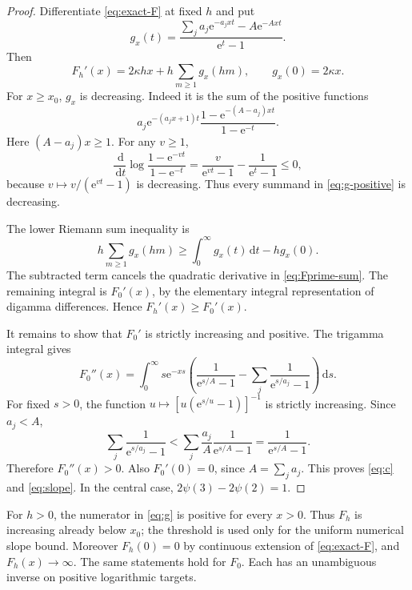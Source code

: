 \documentclass[11pt,a4paper]{article}
\numberwithin{equation}{section}
\theoremstyle{definition}\newtheorem{definition}[theorem]{Definition}
\theoremstyle{remark}\newtheorem{remark}[theorem]{Remark}
\newcommand{\e}{\mathrm e}
\newcommand{\dd}{\,\mathrm d}
\begin{document}
\begin{proof}
Differentiate \eqref{eq:exact-F} at fixed $h$ and put
\begin{equation}
 g_x(t)=\frac{\sum_j a_j\e^{-a_jxt}-A\e^{-Axt}}{\e^t-1}.
 \label{eq:g}
\end{equation}
Then
\begin{equation}
 F_h'(x)=2\kappa hx+h\sum_{m\ge1}g_x(hm),\qquad
 g_x(0)=2\kappa x.
 \label{eq:Fprime-sum}
\end{equation}
For $x\ge x_0$, $g_x$ is decreasing. Indeed it is the sum of the positive
functions
\begin{equation}
 a_j\e^{-(a_jx+1)t}
       \frac{1-\e^{-(A-a_j)xt}}{1-\e^{-t}}.
 \label{eq:g-positive}
\end{equation}
Here $(A-a_j)x\ge1$. For any $v\ge1$,
\[
 \frac{\dd}{\dd t}\log\frac{1-\e^{-vt}}{1-\e^{-t}}
      =\frac{v}{\e^{vt}-1}-\frac1{\e^t-1}\le0,
\]
because $v\mapsto v/(\e^{vt}-1)$ is decreasing. Thus every summand in
\eqref{eq:g-positive} is decreasing.

The lower Riemann sum inequality is
\[
 h\sum_{m\ge1}g_x(hm)\ge\int_0^\infty g_x(t)\dd t-hg_x(0).
\]
The subtracted term cancels the quadratic derivative in
\eqref{eq:Fprime-sum}. The remaining integral is $F_0'(x)$, by the elementary
integral representation of digamma differences. Hence $F_h'(x)\ge F_0'(x)$.

It remains to show that $F_0'$ is strictly increasing and positive. The
trigamma integral gives
\begin{equation}
 F_0''(x)=\int_0^\infty s\e^{-xs}
 \left(\frac1{\e^{s/A}-1}
             -\sum_j\frac1{\e^{s/a_j}-1}\right)\dd s.
 \label{eq:F0-second}
\end{equation}
For fixed $s>0$, the function
$u\mapsto [u(\e^{s/u}-1)]^{-1}$ is strictly increasing. Since $a_j<A$,
\[
 \sum_j\frac1{\e^{s/a_j}-1}
 <\sum_j\frac{a_j}{A}\frac1{\e^{s/A}-1}
 =\frac1{\e^{s/A}-1}.
\]
Therefore $F_0''(x)>0$. Also $F_0'(0)=0$, since $A=\sum_j a_j$.
This proves \eqref{eq:c} and \eqref{eq:slope}. In the central case,
$2\psi(3)-2\psi(2)=1$.
\end{proof}

For $h>0$, the numerator in \eqref{eq:g} is positive for every $x>0$.
Thus $F_h$ is increasing already below $x_0$; the threshold is used only for
the uniform numerical slope bound. Moreover $F_h(0)=0$ by continuous extension
of \eqref{eq:exact-F}, and $F_h(x)\to\infty$. The same statements hold for
$F_0$. Each has an unambiguous inverse on positive logarithmic targets.
\end{document}
